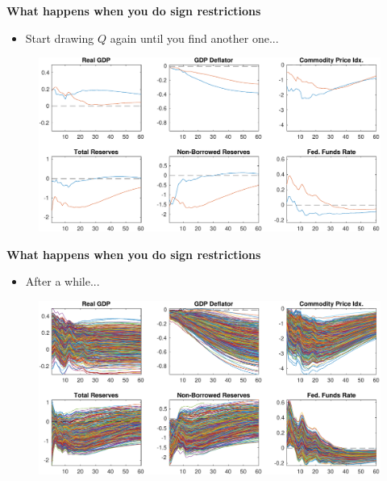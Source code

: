 \documentclass[10pt,english,t,aspectratio=169,ignorenonframetext]{beamer}
\begin{document}
\begin{frame}
{\textbf{What happens when you do sign restrictions }}

\begin{itemize}
\item Start drawing $Q$ again until you find another one...
\end{itemize}

\begin{figure}[h]
\vspace{.3cm}\includegraphics[width=.8\textwidth]{Uhlig_Replication_2rot.pdf}
\end{figure}
\end{frame}


\begin{frame}
{\textbf{What happens when you do sign restrictions }}

\begin{itemize}
\item After a while...
\end{itemize}

\begin{figure}[h]
\vspace{.3cm}\includegraphics[width=.8%
\textwidth]{Uhlig_Replication_500rot.pdf}
\end{figure}
\end{frame}

\end{document}
